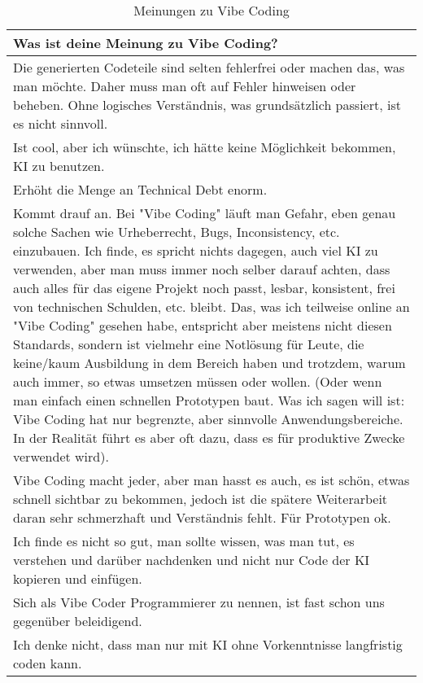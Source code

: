 \documentclass[paper=a4,fontsize=12pt,ngerman]{scrartcl}
\begin{document}
\begin{longtable}{p{8cm}} 
    \caption{Meinungen zu Vibe Coding} \label{tab:meinungen} \\
    \toprule
    \textbf{Was ist deine Meinung zu Vibe Coding?} \\
    \midrule
    Die generierten Codeteile sind selten fehlerfrei oder machen das, was man möchte. Daher muss man oft 
    auf Fehler hinweisen oder beheben. Ohne logisches Verständnis, was grundsätzlich passiert, ist es nicht 
    sinnvoll. \\
    \midrule
    Ist cool, aber ich wünschte, ich hätte keine Möglichkeit bekommen, KI zu benutzen. \\
    \midrule
    Erhöht die Menge an Technical Debt enorm. \\
    \midrule
    Kommt drauf an. Bei "Vibe Coding" läuft man Gefahr, eben genau solche Sachen wie Urheberrecht, Bugs, Inconsistency, etc. einzubauen. 
    Ich finde, es spricht nichts dagegen, auch viel KI zu verwenden, aber man muss immer noch selber darauf achten, dass auch alles für das eigene Projekt noch passt, lesbar, konsistent, frei von technischen Schulden, etc. bleibt. 
    Das, was ich teilweise online an "Vibe Coding" gesehen habe, entspricht aber meistens nicht diesen Standards, sondern ist vielmehr eine Notlösung für Leute, die keine/kaum Ausbildung in dem Bereich haben und trotzdem, warum auch immer, so etwas umsetzen müssen oder wollen. 
    (Oder wenn man einfach einen schnellen Prototypen baut. Was ich sagen will ist: Vibe Coding hat nur begrenzte, aber sinnvolle Anwendungsbereiche. 
    In der Realität führt es aber oft dazu, dass es für produktive Zwecke verwendet wird). \\
    \midrule
    Vibe Coding macht jeder, aber man hasst es auch, es ist schön, etwas schnell sichtbar zu bekommen, jedoch 
    ist die spätere Weiterarbeit daran sehr schmerzhaft und Verständnis fehlt. Für Prototypen ok. \\
    \midrule
    Ich finde es nicht so gut, man sollte wissen, was man tut, es verstehen und darüber nachdenken und nicht nur 
    Code der KI kopieren und einfügen. \\
    \midrule
    Sich als Vibe Coder Programmierer zu nennen, ist fast schon uns gegenüber beleidigend. \\
    \midrule
    Ich denke nicht, dass man nur mit KI ohne Vorkenntnisse langfristig coden kann. \\
    \bottomrule
\end{longtable}
\end{document}
